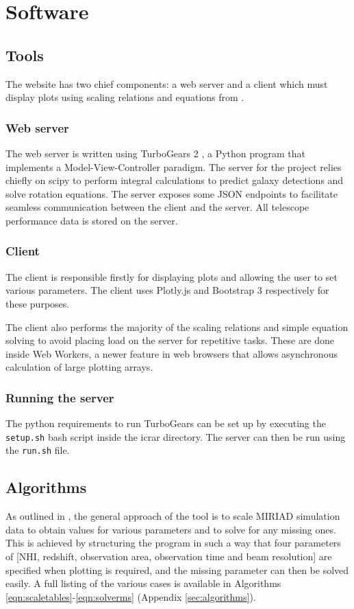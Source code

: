 \documentclass[11pt]{article}
\begin{document}
\section{Software}

\subsection{Tools}

The website has two chief components: a web server and a client which must display plots using scaling relations and equations from \textcite{duffy}.

\subsubsection{Web server}
The web server is written using TurboGears 2 \parencite{turbogears}, a Python program that implements a Model-View-Controller paradigm. The server for the project relies chiefly on scipy \parencite{scipy} to perform integral calculations to predict galaxy detections and solve rotation equations. The server exposes some JSON endpoints to facilitate seamless communication between the client and the server. All telescope performance data is stored on the server.

\subsubsection{Client}
The client is responsible firstly for displaying plots and allowing the user to set various parameters. The client uses Plotly.js \parencite{plotly} and Bootstrap 3 \parencite{bootstrap} respectively for these purposes.

The client also performs the majority of the scaling relations and simple equation solving to avoid placing load on the server for repetitive tasks. These are done inside Web Workers, a newer feature in web browsers that allows asynchronous calculation of large plotting arrays.

\subsubsection{Running the server}
The python requirements to run TurboGears can be set up by executing the \verb|setup.sh| bash script inside the icrar directory. The server can then be run using the \verb|run.sh| file.

\subsection{Algorithms}
As outlined in \textcite{popping2014}, the general approach of the tool is to scale MIRIAD simulation data to obtain values for various parameters and to solve for any missing ones. This is achieved by structuring the program in such a way that four parameters of [NHI, redshift, observation area, observation time and beam resolution] are specified when plotting is required, and the missing parameter can then be solved easily. A full listing of the various cases is available in Algorithms \ref{eqn:scaletables}-\ref{eqn:solverms} (Appendix \ref{sec:algorithms}).
\end{document}
